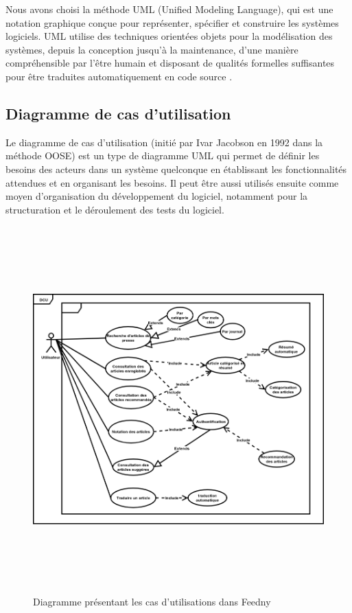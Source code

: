 Nous avons choisi la méthode UML (Unified Modeling Language), qui est une notation graphique conçue pour représenter, spécifier et construire les systèmes logiciels. UML utilise des techniques orientées objets pour la modélisation des systèmes, depuis la conception jusqu'à la maintenance, d'une manière compréhensible par l'être humain et disposant de qualités formelles suffisantes pour être traduites automatiquement en code source \cite{UML}.

\subsection{Diagramme de cas d'utilisation}
\textquotedbl Le diagramme de cas d'utilisation (initié par Ivar Jacobson en 1992 dans la méthode OOSE) est un type de diagramme UML qui permet de définir les besoins des acteurs dans un système quelconque en établissant les fonctionnalités attendues et en organisant les besoins. Il peut être aussi utilisés ensuite comme moyen d'organisation du développement du logiciel, notamment pour la structuration et le déroulement des tests du logiciel\textquotedbl .\cite{UML}
\begin{figure}[H]
    \centering
    \includegraphics[height=400pt,width=350pt]{img/chapter3/diagcasdutilisation.png}
    \caption{Diagramme présentant les cas d'utilisations dans \textquotedbl Feedny\textquotedbl }
\end{figure}

